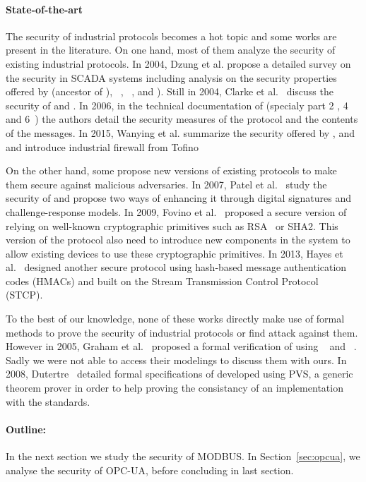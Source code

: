 \paragraph{State-of-the-art}\label{sec:intro_sota}

The security of industrial protocols becomes a hot topic and some works are
present in the literature.
On one hand, most of them analyze the security of existing industrial protocols.
In 2004, Dzung et al. propose a detailed survey on the security in SCADA systems
including analysis on the security properties offered by \opc (ancestor of
\opcua), \mms~\cite{ISO_MMS}, ~\cite{IEC_61850}, \iccp
\cite{IEC_60870} and \etherip).
Still in 2004, Clarke et al.~\cite{CR04} discuss the security of \dnp and
\iccp.
In 2006, in the technical documentation of \opcua (specialy part 2
\cite{opcua_part2}, 4~\cite{opcua_part4} and 6~\cite{opcua_part6}) the authors
detail the security measures of the protocol and the contents of the messages.
In 2015, Wanying et al. summarize the security offered by \modbus, \dnp and \opc
and introduce industrial firewall from Tofino~\cite{TOFINO}

On the other hand, some propose new versions of existing protocols to make them
secure against malicious adversaries.
In 2007, Patel et al.~\cite{PY07} study the security of \dnp and propose two
ways of enhancing it through digital signatures and challenge-response models.
In 2009, Fovino et al.~\cite{FCMT09} proposed a secure version of \modbus
relying on well-known cryptographic primitives such as RSA~\cite{RSA78} or SHA2.
This version of the protocol also need to introduce new components in the system
to allow existing devices to use these cryptographic primitives.
In 2013, Hayes et al.~\cite{HE13} designed another secure \modbus protocol using
hash-based message authentication codes (HMACs) and built on the Stream
Transmission Control Protocol~\cite{Ste07} (STCP).

To the best of our knowledge, none of these works directly make use of formal
methods to prove the security of industrial protocols or find attack against
them.
However in 2005, Graham et al.~\cite{GP05} proposed a formal verification of
\dnp using \ofmc~\cite{BMV03} and \spear~\cite{SH01}.
\TODO Sadly we were not able to access their modelings to discuss them with
ours.
In 2008, Dutertre~\cite{Dut08} detailed formal specifications of \modbus
developed using PVS, a generic theorem prover in order to help proving the
consistancy of an implementation with the standards.

\paragraph{Outline:} In the next section we study the security of  MODBUS. In Section~\ref{sec:opcua}, we analyse the security of OPC-UA, before concluding in last section.
